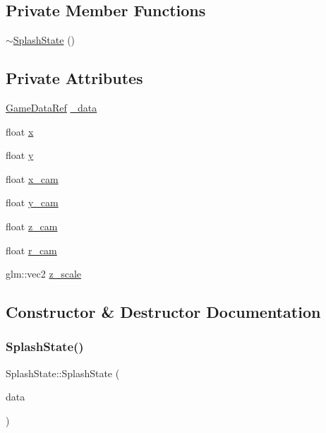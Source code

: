 \subsection*{Private Member Functions}
\begin{DoxyCompactItemize}
\item 
\hyperlink{classSplashState_a3171ebc16024564fced18948bf9d7ec5}{$\sim$\+Splash\+State} ()
\end{DoxyCompactItemize}
\subsection*{Private Attributes}
\begin{DoxyCompactItemize}
\item 
\hyperlink{game_8h_a513c9dd465a0df41dbb4daf40cc717c2}{Game\+Data\+Ref} \hyperlink{classSplashState_a45b2f9003eec03f998319695faadfb42}{\+\_\+data}
\item 
float \hyperlink{classSplashState_ad74688dceca650f340e9113938234547}{x}
\item 
float \hyperlink{classSplashState_a4477fcbed7b631aaf135359a09bb0b3c}{y}
\item 
float \hyperlink{classSplashState_a4264ee844097c44c250a95457aa7da2f}{x\+\_\+cam}
\item 
float \hyperlink{classSplashState_adce1ee0219be0b1045a578c4cae88b3b}{y\+\_\+cam}
\item 
float \hyperlink{classSplashState_a4c2362acca2844d0cbcdc2fc958d68a6}{z\+\_\+cam}
\item 
float \hyperlink{classSplashState_a20b119095bf99299609bf381224624c9}{r\+\_\+cam}
\item 
glm\+::vec2 \hyperlink{classSplashState_aa80fb9876f76790eb989071b213c967f}{z\+\_\+scale}
\end{DoxyCompactItemize}


\subsection{Constructor \& Destructor Documentation}
\mbox{\label{classSplashState_a4894c4858ae1db288cf9d4f8b03fd2d4}} 
\subsubsection{\texorpdfstring{Splash\+State()}{SplashState()}}
{\footnotesize\ttfamily Splash\+State\+::\+Splash\+State (\begin{DoxyParamCaption}\item[{\hyperlink{game_8h_a513c9dd465a0df41dbb4daf40cc717c2}{Game\+Data\+Ref}}]{data }\end{DoxyParamCaption})}

